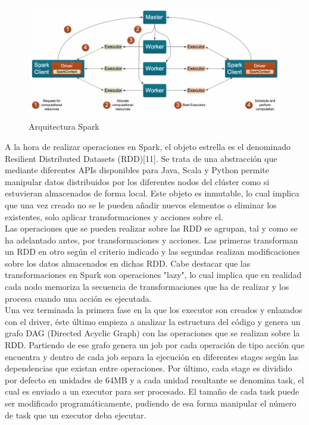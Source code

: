 \begin{figure}[h]
	\centering
	\includegraphics[width=1\textwidth]{Ilustraciones/spark_architecture.png}
	\caption{Arquitectura Spark}
	\label{fig:spark_architecture}
\end{figure}

A la hora de realizar operaciones en Spark, el objeto estrella es el denominado Resilient Distributed Datasets (RDD)[11]. Se trata de una abstracción que mediante diferentes APIs disponibles para Java, Scala y Python permite manipular datos distribuidos por los diferentes nodos del clúster como si estuvieran almacenados de forma local. Este objeto es inmutable, lo cual implica que una vez creado no se le pueden añadir nuevos elementos o eliminar los existentes, solo aplicar transformaciones y acciones sobre el.\\

Las operaciones que se pueden realizar sobre las RDD se agrupan, tal y como se ha adelantado antes, por transformaciones y acciones. Las primeras transforman un RDD en otro según el criterio indicado y las segundas realizan modificaciones sobre los datos almacenados en dichas RDD. Cabe destacar que las transformaciones en Spark son operaciones "lazy", lo cual implica que en realidad cada nodo memoriza la secuencia de transformaciones que ha de realizar y los procesa cuando una acción es ejecutada.\\

Una vez terminada la primera fase en la que los executor son creados y enlazados con el driver, éste último empieza a analizar la estructura del código y genera un grafo DAG (Directed Acyclic Graph) con las operaciones que se realizan sobre la RDD. Partiendo de ese grafo genera un job por cada operación de tipo acción que encuentra y dentro de cada job separa la ejecución en diferentes stages según las dependencias que existan entre operaciones. Por último, cada stage es dividido por defecto en unidades de 64MB y a cada unidad resultante se denomina task, el cual es enviado a un executor para ser procesado. El tamaño de cada task puede ser modificado programáticamente, pudiendo de esa forma manipular el número de task que un executor deba ejecutar.\\

